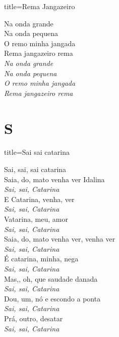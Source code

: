 \documentclass[fontsize=14pt, paper=a4, twoside, DIV=20]{scrreprt} %
\newcommand\chapTOC[1]{
    \chapter*{#1}
    \addcontentsline{toc}{chapter}{#1}
    \markboth{#1}{#1}}
\begin{document}
\begin{multicols*}{2}
\begin{song}{title={Rema Jangazeiro}}
    \begin{verse*}
        Na onda grande\\
        Na onda pequena\\
        O remo minha jangada\\
        Rema jangazeiro rema\\

        \textit{Na onda grande\\
        Na onda pequena\\
        O remo minha jangada\\
        Rema jangazeiro rema\\
}

    \end{verse*}
\end{song}

\chapTOC{S}

\begin{song}{title={Sai sai catarina}}
        \begin{verse*}
            Sai, sai, sai catarina\\
            Saia, do, mato venha ver Idalina\\
            \textit{Sai, sai, Catarina}\\
            E Catarina, venha, ver\\
            \textit{Sai, sai, Catarina}\\
            Vatarina, meu, amor\\
            \textit{Sai, sai, Catarina}\\
            Saia, do, mato venha ver, venha ver\\
            \textit{Sai, sai, Catarina}\\
            É catarina, minha, nega\\
            \textit{Sai, sai, Catarina}\\
            Mas,, oh, que saudade danada\\
            \textit{Sai, sai, Catarina}\\
            Dou, um, nó e escondo a ponta\\
            \textit{Sai, sai, Catarina}\\
            Prá, outro, desatar\\
            \textit{Sai, sai, Catarina}\\
        \end{verse*}
\end{song}


\end{multicols*}
\end{document}
